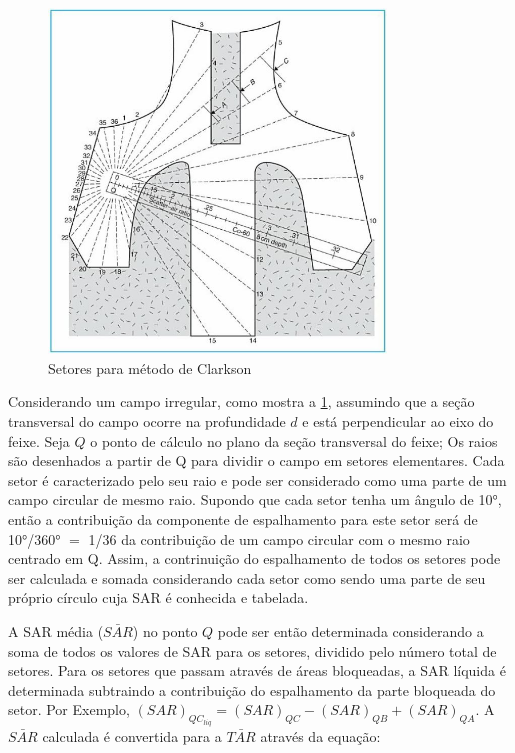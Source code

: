\documentclass[11pt,a4paper]{article}
\begin{document}
	\begin{figure}[h]
		\centering
		\includegraphics[width=0.8\textwidth]{Imagens/clarkson.JPG}
		\caption{Setores para método de Clarkson}
		\label{fig:clarkson}                
	\end{figure}

	Considerando um campo irregular, como mostra a \ref{fig:clarkson}, assumindo que a seção transversal do campo ocorre na profundidade $d$ e está perpendicular ao eixo do feixe. Seja $Q$ o ponto de cálculo no plano da seção transversal do feixe; Os raios são desenhados a partir de Q para dividir o campo em setores elementares. Cada setor é caracterizado pelo seu raio e pode ser considerado como uma parte de um campo circular de mesmo raio. Supondo que cada setor tenha um ângulo de \ang{10}, então a contribuição da componente de espalhamento para este setor será de \ang{10}/\ang{360} $=$ 1/36 da contribuição de um campo circular com o mesmo raio centrado em Q. Assim, a contrinuição do espalhamento de todos os setores pode ser calculada e somada considerando cada setor como sendo uma parte de seu próprio círculo cuja SAR é conhecida e tabelada. 

	A SAR média ($\bar{SAR}$) no ponto $Q$  pode ser então determinada considerando a soma de todos os valores de SAR para os setores, dividido pelo número total de setores. Para os setores que passam através de áreas bloqueadas, a SAR líquida é determinada subtraindo a contribuição do espalhamento da parte bloqueada do setor. Por Exemplo, $(SAR)_{QC_{liq}} = (SAR)_{QC} - (SAR)_{QB} + (SAR)_{QA}$. A $\bar{SAR}$ calculada é convertida para a $\bar{TAR}$ através da equação:
\end{document}
